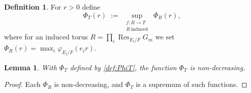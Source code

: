 \documentclass[american]{article}
\numberwithin{equation}{section}
\numberwithin{figure}{section}
\theoremstyle{plain}
\newtheorem{lemma}[theorem]{Lemma}
\theoremstyle{definition}
\newtheorem{definition}[theorem]{Definition}
\theoremstyle{remark}
\DeclareMathOperator{\Res}{Res}
\newcommand{\G}{G}
\begin{document}
\begin{definition}\label{def:PhiT}
For $r>0$ define
\[
\Phi_T(r)\;:=\;\sup_{\substack{f:R\to T\\ R\ \text{induced}}}\ \Phi_R(r),
\]
where for an induced torus $R=\prod_i\Res_{E_i/F}\G_m$ we set
$\Phi_R(r)=\max_i \varphi_{E_i/F}(e_ir)$.
\end{definition}

\begin{lemma}\label{lem:PhiT-monotone}
With $\Phi_T$ defined by \eqref{def:PhiT}, the function $\Phi_T$ is non-decreasing.
\end{lemma}

\begin{proof}
Each $\Phi_R$ is non-decreasing, and $\Phi_T$ is a supremum of such functions.
\end{proof}
\end{document}

